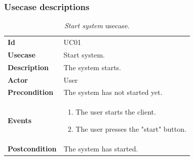 \clearpage
\subsubsection{Usecase descriptions}
\begin{table}[h!t]
    \centering
    \caption{\emph{Start system} usecase.}
    \label{tab:uc:system}
    \centering
    \begin{tabular}{l | p{80mm}}
        \textbf{Id}            & UC01                            \\
        \textbf{Usecase}       & Start system.                   \\
        \textbf{Description}   & The system starts.              \\
        \textbf{Actor}         & User                            \\
        \textbf{Precondition}  & The system has not started yet. \\
        \textbf{Events}        & \begin{enumerate}
            \item The user starts the client.
            \item The user presses the "start" button.
        \end{enumerate}       \\
        \textbf{Postcondition} & The system has started.
    \end{tabular}
\end{table}

